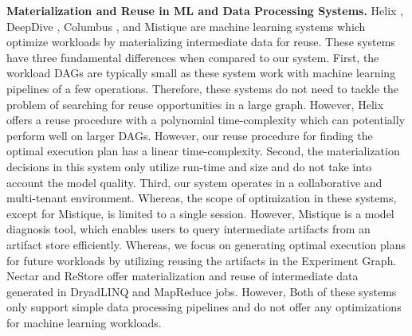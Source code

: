 \textbf{Materialization and Reuse in ML and Data Processing Systems.}
Helix \cite{xin2018h, xin2018helix}, DeepDive \cite{zhang2015deepdive}, Columbus \cite{zhang2016materialization}, and Mistique \cite{vartak2018mistique} are machine learning systems which optimize workloads by materializing intermediate data for reuse.
These systems have three fundamental differences when compared to our system.
First, the workload DAGs are typically small as these system work with machine learning pipelines of a few operations.
Therefore, these systems do not need to tackle the problem of searching for reuse opportunities in a large graph.
However, Helix offers a reuse procedure with a polynomial time-complexity which can potentially perform well on larger DAGs.
However, our reuse procedure for finding the optimal execution plan has a linear time-complexity.
Second, the materialization decisions in this system only utilize run-time and size and do not take into account the model quality.
Third, our system operates in a collaborative and multi-tenant environment.
Whereas, the scope of optimization in these systems, except for Mistique, is limited to a single session.
However, Mistique is a model diagnosis tool, which enables users to query intermediate artifacts from an artifact store efficiently.
Whereas, we focus on generating optimal execution plans for future workloads by utilizing reusing the artifacts in the Experiment Graph.
Nectar \cite{gunda2010nectar} and ReStore \cite{elghandour2012restore} offer materialization and reuse of intermediate data generated in DryadLINQ \cite{fetterly2009dryadlinq} and MapReduce jobs.
However, Both of these systems only support simple data processing pipelines and do not offer any optimizations for machine learning workloads.